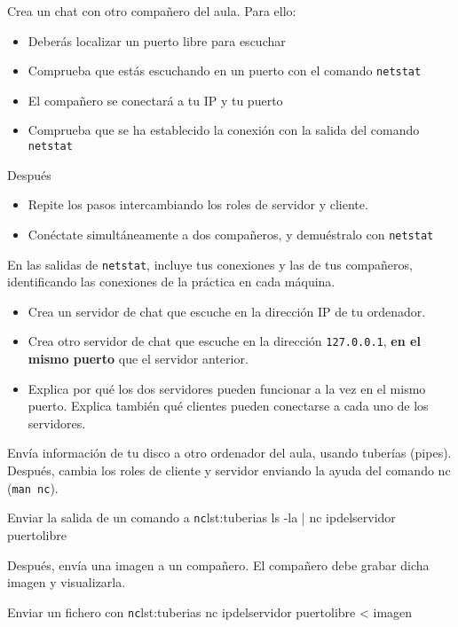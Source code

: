 \begin{homeworkProblem}
  Crea un chat con otro compañero del aula. Para ello:
  \begin{itemize}
  \item Deberás localizar un puerto libre para escuchar
  \item Comprueba que estás escuchando en un puerto con el comando \texttt{netstat}
  \item El compañero se conectará a tu IP y tu puerto
  \item Comprueba que se ha establecido la conexión con la salida del comando \texttt{netstat}
  \end{itemize}

  Después
  \begin{itemize}
  \item Repite los pasos intercambiando los roles de servidor y cliente.
  \item Conéctate simultáneamente a dos compañeros, y demuéstralo con \texttt{netstat}
  \end{itemize}

  En las salidas de \texttt{netstat}, incluye tus conexiones y las de tus compañeros, identificando las conexiones de la práctica en cada máquina.
\end{homeworkProblem}

\begin{homeworkProblem}
  \begin{itemize}
  \item Crea un servidor de chat que escuche en la dirección IP de tu ordenador.
  \item Crea otro servidor de chat que escuche en la dirección \texttt{127.0.0.1}, \textbf{en el mismo puerto} que el servidor anterior.
  \item Explica por qué los dos servidores pueden funcionar a la vez en el mismo puerto. Explica también qué clientes pueden conectarse a cada uno de los servidores.
\end{itemize}
\end{homeworkProblem}



\begin{homeworkProblem}
  Envía información de tu disco a otro ordenador del aula, usando tuberías (pipes). Después, cambia los roles de cliente y servidor enviando la ayuda del comando nc (\texttt{man nc}).

  
  \begin{listadoshell}{Enviar la salida de un comando a \texttt{nc}}{lst:tuberias}
    ls -la | nc ipdelservidor puertolibre
  \end{listadoshell}

  Después, envía una imagen a un compañero. El compañero debe grabar dicha imagen y visualizarla.

  \begin{listadoshell}{Enviar un fichero con \texttt{nc}}{lst:tuberias}
    nc ipdelservidor puertolibre < imagen
  \end{listadoshell}
\end{homeworkProblem}


